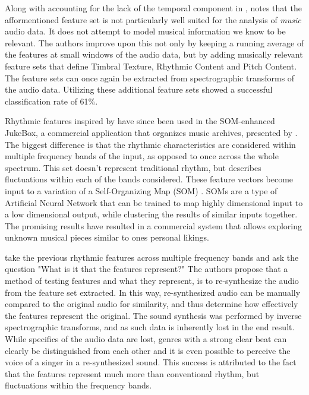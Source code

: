 \documentclass[12pt]{article}
\begin{document}
Along with accounting for the lack of the temporal component in \citet{Wold96}, \citet{Tzanetakis02} notes that the afformentioned feature set is not particularly well suited for the analysis of \textit{music} audio data. It does not attempt to model musical information we know to be relevant. The authors improve upon this not only by keeping a running average of the features at small windows of the audio data, but by adding musically relevant feature sets that define Timbral Texture, Rhythmic Content and Pitch Content. The feature sets can once again be extracted from spectrographic transforms of the audio data. Utilizing these additional feature sets showed a successful classification rate of 61\%.

Rhythmic features inspired by \citet{Tzanetakis02} have since been used in the SOM-enhanced JukeBox, a commercial application that organizes music archives, presented by \citet{rauber2003som}. The biggest difference is that the rhythmic characteristics are considered within multiple frequency bands of the input, as opposed to once across the whole spectrum. This set doesn't represent traditional rhythm, but describes fluctuations within each of the bands considered. These feature vectors become input to a variation of a Self-Organizing Map (SOM) \citep{kohonen2002make}. SOMs are a type of Artificial Neural Network that can be trained to map highly dimensional input to a low dimensional output, while clustering the results of similar inputs together. The promising results have resulted in a commercial system that allows exploring unknown musical pieces similar to ones personal likings.

\citet{Lidy05} take the previous rhythmic features across multiple frequency bands and ask the question "What is it that the features represent?" The authors propose that a method of testing features and what they represent, is to re-synthesize the audio from the feature set extracted. In this way, re-synthesized audio can be manually compared to the original audio for similarity, and thus determine how effectively the features represent the original. The sound synthesis was performed by inverse spectrographic transforms, and as such data is inherently lost in the end result. While specifics of the audio data are lost, genres with a strong clear beat can clearly be distinguished from each other and it is even possible to perceive the voice of a singer in a re-synthesized sound. This success is attributed to the fact that the features represent much more than conventional rhythm, but fluctuations within the frequency bands.
\end{document}
